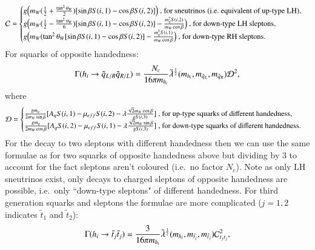 \documentclass[final,3p,times]{elsarticle}
\begin{document}
\begin{equation}
\mathcal{C} = \begin{cases} g\Big(m_{W}(\frac{1}{2}+{\tan^2 \theta_W \over 2})[\sin\beta S(i,1) - \cos\beta S(i,2)]\Big) $ , for sneutrinos (i.e.\ equivalent of up-type LH),$ \\
							g\Big(m_{W}(\frac{1}{2}-{\tan^2 \theta_W \over 6})[\sin\beta S(i,1) - \cos\beta S(i,2)] - {m_{q}^2 S(i,2) \over m_{W} \cos\beta}\Big) $ , for down-type LH sleptons, $ \\
							g\Big(m_{W}(\tan^2 \theta_W[\sin\beta S(i,1) - \cos\beta S(i,2)] - {m_{q}^2 S(i,1) \over m_{W} \cos\beta}\Big) $ , for down-type RH sleptons$. \\
							\end{cases}
\end{equation}
For squarks of opposite handedness:
\begin{equation} \label{hqLRqRLNMSSM}
\Gamma( h_{i} \rightarrow \tilde{q}_{L/R} \tilde{q}_{R/L} ) = {N_{c} \over 16\pi m_{h_i}} \tilde{\lambda}^{1 \over 2}(m_{{h}_i},m_{\tilde{q}_L},m_{\tilde{q}_R})\mathcal{D}^2,
\end{equation}
where
\begin{equation}
\mathcal{D} = \begin{cases} {g m_{q} \over 2 m_{W} \sin\beta} [A_{q} S(i,1) - \mu_{eff}S(i,2) - \lambda {\sqrt{2} m_{W} \cos\beta \over g S(i,3)}]  $ , for up-type squarks of different handedness,$ \\
							{g m_{q} \over 2 m_{W} \cos\beta} [A_{q} S(i,2) - \mu_{eff}S(i,1) - \lambda {\sqrt{2} m_{W} \sin\beta \over g S(i,3)}]  $ , for down-type squarks of different handedness$. \\
							\end{cases}
\end{equation}
For the decay to two sleptons with different handedness then we can use the same formulae as for two squarks of opposite handedness above but dividing by 3 to account for the fact sleptons aren't coloured (i.e.\ no factor $N_{c}$). Note as only LH sneutrinos exist, only decays to charged sleptons of opposite handedness are possible, i.e.\ only ``down-type sleptons" of different handedness.
For third generation squarks and sleptons the formulae are more complicated ($j = 1,2$ indicates $\tilde{t}_1$ and $\tilde{t}_2$):
\begin{equation} \label{hststNMSSM}
\Gamma( h_{i} \rightarrow \tilde{t}_{j} \tilde{t}_{j} ) = {3 \over 16\pi m_{h_i}} \tilde{\lambda}^{1 \over 2}(m_{{h}_i},m_{\tilde{t}_j},m_{\tilde{t}_j})\mathcal{C}_{t_{j}t_{j}}^2,
\end{equation}
\end{document}
